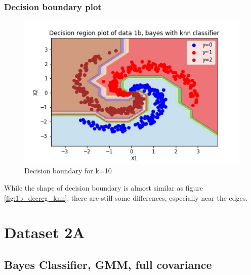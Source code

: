 \documentclass[11pt,a4paper]{article}
\begin{document}
\subsubsection{Decision boundary plot}
\begin{figure}[H]
    \centering
    \includegraphics{images/1b_nb_decision_region.jpg}
    \caption{Decision boundary for k=10}
    \label{fig:1b_decreg_nb}
\end{figure}
While the shape of decision boundary is almost similar as figure \ref{fig:1b_decreg_knn}, there are still some differences, especially near the edges.

\break
\section{Dataset 2A}
\subsection{Bayes Classifier, GMM, full covariance}
\end{document}
